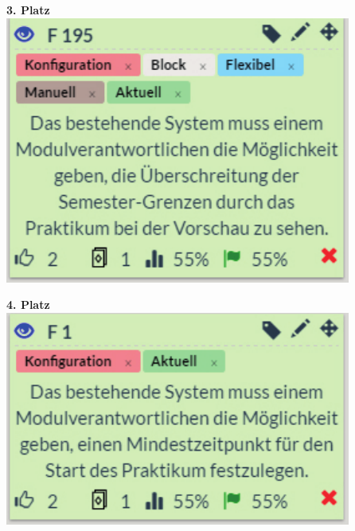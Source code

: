 \begin{minipage}[t]{.5\textwidth}
	\centering
   \vspace{16pt}
   		\textbf{3. Platz}\\
   		\vspace{16pt}
		\includegraphics[width=\textwidth]{images/3.pdf}
\end{minipage}
\begin{minipage}[t]{.5\textwidth}
	\centering
   \vspace{16pt}
   		\textbf{4. Platz}\\
   		\vspace{16pt}
		\includegraphics[width=\textwidth]{images/4.pdf}
\end{minipage}



